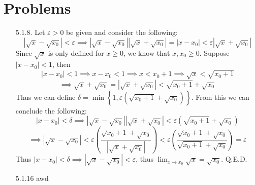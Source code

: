 \documentclass[11pt]{article}
\newcommand{\vertb}[1]{\left\vert#1\right\vert}
\newcommand{\braces}[1]{\left\{#1\right\}}
\newcommand{\parns}[1]{\left(#1\right)}
\newcommand{\e}{\varepsilon}
\newcommand{\lm}[1]{\displaystyle\lim_{#1}}
\begin{document}
\pagestyle{fancy}
\fancyhead{}

\normalsize

\section*{Problems}
\begin{itemize}
    \item [5.1.8.] Let $\e>0$ be given and consider the following:
    \[\vertb{\sqrt{x}-\sqrt{x_0}}<\e\implies\vertb{\sqrt{x}-\sqrt{x_0}}\vertb{\sqrt{x}+\sqrt{x_0}}=\vertb{x-x_0}<\e\vertb{\sqrt{x}+\sqrt{x_0}}\]
    Since $\sqrt{x}$ is only defined for $x\geq0$, we know that $x,x_0\geq0$. Suppose $\vertb{x-x_0}<1$, then
    \[\vertb{x-x_0}<1\implies x-x_0<1\implies x<x_0+1\implies\sqrt{x}<\sqrt{x_0+1}\]
    \[\implies\sqrt{x}+\sqrt{x_0}=\vertb{\sqrt{x}+\sqrt{x_0}}<\sqrt{x_0+1}+\sqrt{x_0}\]
    Thus we can define $\delta=\min\braces{1,\e\parns{\sqrt{x_0+1}+\sqrt{x_0}}}$. From this we can conclude the following:
    \[\vertb{x-x_0}<\delta\implies\vertb{\sqrt{x}-\sqrt{x_0}}\vertb{\sqrt{x}+\sqrt{x_0}}<\e\parns{\sqrt{x_0+1}+\sqrt{x_0}}\]
    \[\implies\vertb{\sqrt{x}-\sqrt{x_0}}<\e\parns{\frac{\sqrt{x_0+1}+\sqrt{x_0}}{\vertb{\sqrt{x}+\sqrt{x_0}}}}<\e\parns{\frac{\sqrt{x_0+1}+\sqrt{x_0}}{\sqrt{x_0+1}+\sqrt{x_0}}}=\e\]
    Thus $\vertb{x-x_0}<\delta\implies\vertb{\sqrt{x}-\sqrt{x_0}}<\e$, thus $\lm{x\to x_0}\sqrt{x}=\sqrt{x_0}$. Q.E.D.

    \item [5.1.16] awd
\end{itemize}
\end{document}
